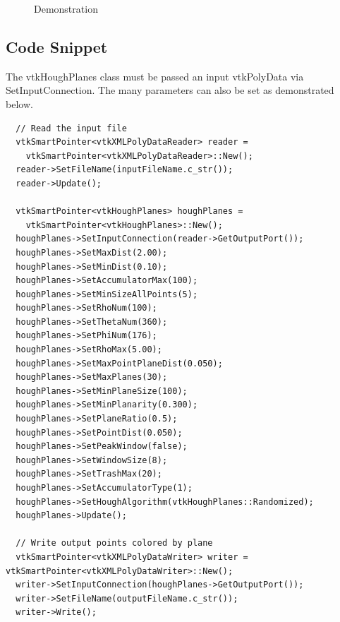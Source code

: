 \documentclass{InsightArticle}
\begin{document}
\begin{figure}[H]
\centering
{}
\caption{Demonstration}
\label{fig:Demonstration}
\end{figure}

\subsection{Code Snippet}
The vtkHoughPlanes class must be passed an input vtkPolyData via SetInputConnection. The many parameters can also be set as demonstrated below.
\begin{verbatim}
  // Read the input file
  vtkSmartPointer<vtkXMLPolyDataReader> reader =
    vtkSmartPointer<vtkXMLPolyDataReader>::New();
  reader->SetFileName(inputFileName.c_str());
  reader->Update();
  
  vtkSmartPointer<vtkHoughPlanes> houghPlanes =
    vtkSmartPointer<vtkHoughPlanes>::New();
  houghPlanes->SetInputConnection(reader->GetOutputPort());
  houghPlanes->SetMaxDist(2.00);
  houghPlanes->SetMinDist(0.10);
  houghPlanes->SetAccumulatorMax(100);
  houghPlanes->SetMinSizeAllPoints(5);
  houghPlanes->SetRhoNum(100);
  houghPlanes->SetThetaNum(360);
  houghPlanes->SetPhiNum(176);
  houghPlanes->SetRhoMax(5.00);
  houghPlanes->SetMaxPointPlaneDist(0.050);
  houghPlanes->SetMaxPlanes(30);
  houghPlanes->SetMinPlaneSize(100);
  houghPlanes->SetMinPlanarity(0.300);
  houghPlanes->SetPlaneRatio(0.5);
  houghPlanes->SetPointDist(0.050);
  houghPlanes->SetPeakWindow(false);
  houghPlanes->SetWindowSize(8);
  houghPlanes->SetTrashMax(20);
  houghPlanes->SetAccumulatorType(1);
  houghPlanes->SetHoughAlgorithm(vtkHoughPlanes::Randomized);
  houghPlanes->Update();

  // Write output points colored by plane
  vtkSmartPointer<vtkXMLPolyDataWriter> writer = vtkSmartPointer<vtkXMLPolyDataWriter>::New();
  writer->SetInputConnection(houghPlanes->GetOutputPort());
  writer->SetFileName(outputFileName.c_str());
  writer->Write();

\end{verbatim}
\end{document}
